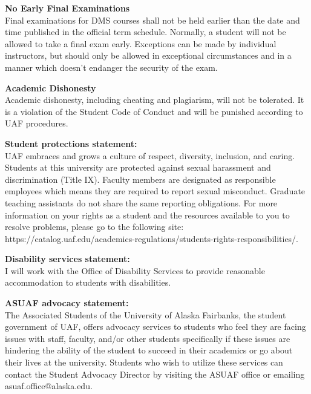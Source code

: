 \documentclass[12pt]{article}
\renewcommand{\emph}[1]{\textsf{\textbf{#1}}}
\newcommand{\localhead}[1]{\par\smallskip\textbf{#1}\nobreak\\}%
\def\subheading#1{\localhead{\emph{#1}}}
\begin{document}
\subheading{No Early Final Examinations}
Final examinations for DMS
  courses shall not be held earlier than the date and time published
  in the official term schedule. Normally, a student will not be
  allowed to take a final exam early. Exceptions can be made by
  individual instructors, but should only be allowed in exceptional
  circumstances and in a manner which doesn't endanger the security of
  the exam.

\subheading{Academic Dishonesty}
Academic dishonesty, including cheating and plagiarism, will not
be tolerated.  It is a violation of the Student Code of Conduct
and will be punished according to UAF procedures.

 
\subheading{ Student protections statement:} UAF embraces and grows a culture of respect, diversity, inclusion, and caring. Students at this university are protected against sexual harassment and discrimination (Title IX). Faculty members are designated as responsible employees which means they are required to report sexual misconduct. Graduate teaching assistants do not share the same reporting obligations. For more information on your rights as a student and the resources available to you to resolve problems, please go to the following site: https://catalog.uaf.edu/academics-regulations/students-rights-responsibilities/.

\subheading{Disability services statement:} I will work with the Office of Disability Services to provide reasonable accommodation to students with disabilities.

\subheading{ASUAF advocacy statement:} The Associated Students of the University of Alaska Fairbanks, the student government of UAF, offers advocacy services to students who feel they are facing issues with staff, faculty, and/or other students specifically if these issues are hindering the ability of the student to succeed in their academics or go about their lives at the university. Students who wish to utilize these services can contact the Student Advocacy Director by visiting the ASUAF office or emailing asuaf.office@alaska.edu. 
\end{document}
